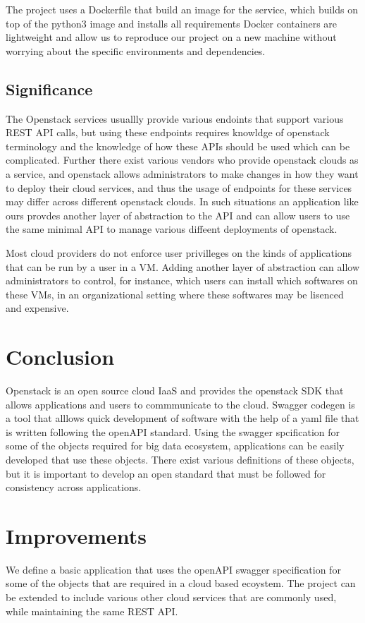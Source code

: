 The project uses a Dockerfile that build an image for the
service, which builds on top of the python3 image and installs all requirements
Docker containers are lightweight and allow us to reproduce our project on a
new machine without worrying about the specific environments and dependencies.

\subsection{Significance}
The Openstack services usuallly provide various endoints that support
various REST API calls, but using these endpoints requires knowldge of
openstack terminology and the knowledge of how these APIs should be
used which can be complicated. Further there exist various vendors who
provide openstack clouds as a service, and openstack allows
administrators to make changes in how they want to deploy their cloud
services, and thus the usage of endpoints for these services may
differ across different openstack clouds. In such situations an
application like ours provdes another layer of abstraction to the API
and can allow users to use the same minimal API to manage various
diffeent deployments of openstack.

Most cloud providers do not enforce user privilleges on the kinds of
applications that can be run by a user in a VM. Adding another layer
of abstraction can allow administrators to control, for instance,
which users can install which softwares on these VMs, in an
organizational setting where these softwares may be lisenced and
expensive.

\section{Conclusion}
Openstack is an open source cloud IaaS and provides the openstack SDK
that allows applications and users to commmunicate to the
cloud. Swagger codegen is a tool that alllows quick development of
software with the help of a yaml file that is written following the
openAPI standard. Using the swagger spcification for some of the
objects required for big data ecosystem, applications can be easily
developed that use these objects. There exist various definitions of
these objects, but it is important to develop an open standard that
must be followed for consistency across applications.

\section{Improvements}
We define a basic application that uses the openAPI swagger
specification for some of the objects that are required in a cloud
based ecoystem. The project can be extended to include various other
cloud services that are commonly used, while maintaining the same REST
API.

